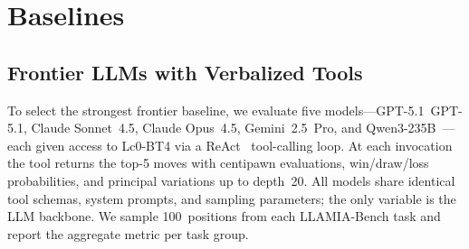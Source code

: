 \section{Baselines}
\label{sec:app_baselines}

\subsection{Frontier LLMs with Verbalized Tools}
\label{sec:app_baseline_frontier}

To select the strongest frontier baseline, we evaluate five
models---GPT-5.1~GPT-5.1, Claude Sonnet~4.5,
Claude Opus~4.5, Gemini~2.5~Pro, and
Qwen3-235B~\cite{yang2025qwen3}---each given access to Lc0-BT4 via a
ReAct~\cite{yao2022react} tool-calling loop.
At each invocation the tool returns the top-5 moves with centipawn
evaluations, win/draw/loss probabilities, and principal variations up to
depth~20.
All models share identical tool schemas, system prompts, and sampling
parameters; the only variable is the LLM backbone.
We sample 100~positions from each LLAMIA-Bench task and report the
aggregate metric per task group.

